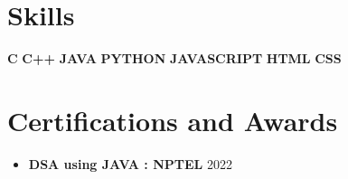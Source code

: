 \documentclass[a4paper,10pt]{article}
\newcommand{\resumeSubSubheading}[2]{
        \item
        \textbf{#1} \hfill #2
    }
\begin{document}
    \section*{\textbf{Skills}}\noindent
    \textbf{C} \hspace{1em}\textbf{C++} \hspace{1em}\textbf{JAVA} \hspace{1em}\textbf{PYTHON} \hspace{1em}\textbf{JAVASCRIPT} \hspace{1em}\textbf{HTML} \hspace{1em}\textbf{CSS}
    \vspace{0.5em}

  
    \section*{\textbf{Certifications and Awards}}
    \begin{itemize}[leftmargin=0.15in, label={}]
        
        \resumeSubSubheading{DSA using JAVA : NPTEL}{2022}
        
        \vspace{-0.1em}
    \end{itemize}
  
    
\end{document}

